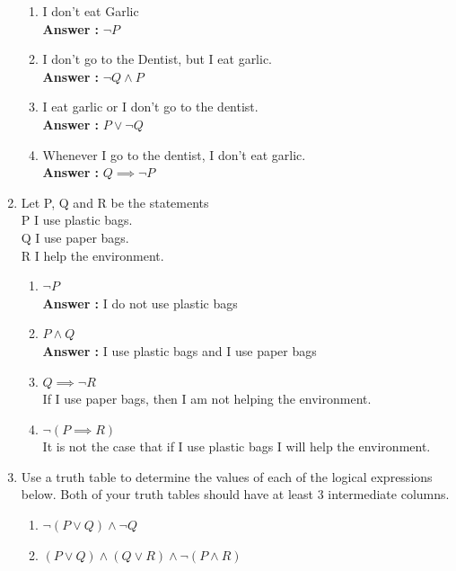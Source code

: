 \documentclass[a4paper,11pt]{article}
\begin{document}
\begin{enumerate}
  \begin{enumerate}
  \item I don't eat Garlic \\
  \textbf{Answer :} $ \neg P$
  \item I don't go to the Dentist, but I eat garlic. \\
  \textbf{Answer :} $ \neg Q \wedge P$
  \item I eat garlic or I don't go to the dentist. \\
  \textbf{Answer :} $P \vee \neg Q$
  \item Whenever I go to the dentist, I don't eat garlic. \\
  \textbf{Answer :} $ Q \implies \neg P$
  \end{enumerate}

\item Let P, Q and R be the statements \\ P I use plastic bags. \\ Q I use paper bags. \\ R I help the environment.

  \begin{enumerate}
  \item $ \neg P$ \\
  \textbf{Answer :} I do not use plastic bags
  \item $P \wedge Q$ \\
  \textbf{Answer :} I use plastic bags and I use paper bags
  \item $Q \implies \neg R$ \\
  If I use paper bags, then I am not helping the environment.
  \item $\neg (P \implies R)$ \\
  It is not the case that if I use plastic bags I will help the environment.
  \end{enumerate}

\item Use a truth table to determine the values of each of the logical expressions below. Both of
your truth tables should have at least 3 intermediate columns.
  \begin{enumerate}
  \item $\neg (P \vee Q) \wedge \neg Q$
  \item $ (P \vee Q) \wedge (Q \vee R) \wedge \neg (P \wedge R)$
  \end{enumerate}



\end{enumerate}
\end{document}
